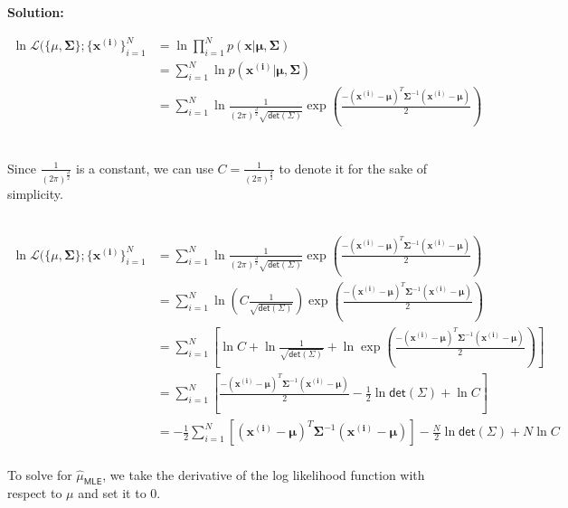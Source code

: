 \documentclass[11pt]{article}
\begin{document}
{\noindent \bf Solution: 

\begin{equation}
    \begin{split}
        \ln \mathcal{L}( \{ \mu, \mathbf{\Sigma} \}; \{ \mathbf{x^{(i)}}\}_{i = 1}^N&=\ln \prod\limits_{i=1}^Np( \mathbf{x} | \mathbf{\mu}, \mathbf{\Sigma})\\
        &=\sum\limits_{i=1}^N\ln p( \mathbf{x^{(i)}} | \mathbf{\mu}, \mathbf{\Sigma})\\
        &=\sum\limits_{i=1}^N\ln \frac{1}{ (2 \pi)^{\frac{d}{2}} \sqrt{ \mathsf{det}(\Sigma) }}
	 \exp \left ( \frac{- ( \mathbf{x^{(i)}} - \mathbf{\mu})^T
	 	\mathbf{\Sigma}^{-1} ( \mathbf{x^{(i)}} - \mathbf{\mu})
	 }{2} \right )
    \end{split}
\end{equation}

\ \\
Since $\frac{1}{(2 \pi)^{\frac{d}{2}}} $ is a constant, we can use $C=\frac{1}{(2 \pi)^{\frac{d}{2}}} $ to denote it for the sake of simplicity.

\ \\
\begin{equation}
    \begin{split}
       \ln \mathcal{L}( \{ \mu, \mathbf{\Sigma} \}; \{ \mathbf{x^{(i)}}\}_{i = 1}^N&= \sum\limits_{i=1}^N\ln \frac{1}{ (2 \pi)^{\frac{d}{2}} \sqrt{ \mathsf{det}(\Sigma) }}
	 \exp \left ( \frac{- ( \mathbf{x^{(i)}} - \mathbf{\mu})^T
	 	\mathbf{\Sigma}^{-1} ( \mathbf{x^{(i)}} - \mathbf{\mu})
	 }{2} \right )\\
	 &= \sum\limits_{i=1}^N\ln \left(C \frac{1}{\sqrt{\mathsf{det}(\Sigma)}} \right)
	 \exp \left ( \frac{- ( \mathbf{x^{(i)}} - \mathbf{\mu})^T
	 	\mathbf{\Sigma}^{-1} ( \mathbf{x^{(i)}} - \mathbf{\mu})
	 }{2} \right )\\
	 &= \sum\limits_{i=1}^N \left [\ln C+\ln\frac{1}{\sqrt{\mathsf{det}(\Sigma)}}+\ln \exp \left ( \frac{- ( \mathbf{x^{(i)}} - \mathbf{\mu})^T
	 	\mathbf{\Sigma}^{-1} ( \mathbf{x^{(i)}} - \mathbf{\mu})
	 }{2} \right )\right]\\
	 &= \sum\limits_{i=1}^N \left [ \frac{- ( \mathbf{x^{(i)}} - \mathbf{\mu})^T
	 	\mathbf{\Sigma}^{-1} ( \mathbf{x^{(i)}} - \mathbf{\mu})
	 }{2} -\frac{1}{2}\ln\mathsf{det}(\Sigma) + \ln C\right]\\
    &= -\frac{1}{2}\sum\limits_{i=1}^N [( \mathbf{x^{(i)}} - \mathbf{\mu})^T
	 	\mathbf{\Sigma}^{-1} ( \mathbf{x^{(i)}} - \mathbf{\mu})]-\frac{N}{2}\ln\mathsf{det}(\Sigma) + N\ln C
    \end{split}
\end{equation}
\ \\
To solve for $\hat{\mu}_{\mathsf{MLE}}$, we take the derivative of the log likelihood function with respect to $\mu$ and set it to 0.

}
\end{document}
